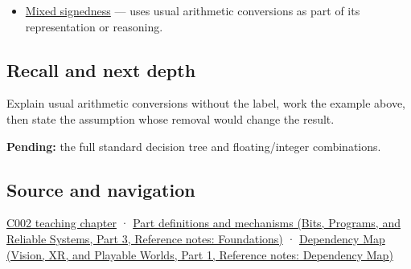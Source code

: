 \hypertarget{appendix-5e2d663adf7f-used-by}{}

\begin{itemize}
\tightlist
\item
  \hyperref[appendix-736a2345de4a]{Mixed signedness} --- uses usual arithmetic conversions as part of its representation or reasoning.
\end{itemize}

\subsection{Recall and next depth}\label{appendix-5e2d663adf7f-recall-and-next-depth}

\hypertarget{appendix-5e2d663adf7f-recall-and-next-depth}{}

Explain usual arithmetic conversions without the label, work the example above, then state the assumption whose removal would change the result.

\textbf{Pending:} the full standard decision tree and floating/integer combinations.

\subsection{Source and navigation}\label{appendix-5e2d663adf7f-source-and-navigation}

\hypertarget{appendix-5e2d663adf7f-source-and-navigation}{}

\hyperref[01-foundations-i-ch001-arithmetic-becomes-a-policy]{C002 teaching chapter} · \href{../01-Bits-Programs-and-Reliable-Systems-P03/main.pdf\#nameddest=appendix-fd090d982a15}{Part definitions and mechanisms (Bits, Programs, and Reliable Systems, Part 3, Reference notes: Foundations)} · \href{../07-Vision-XR-and-Playable-Worlds-P01/main.pdf\#nameddest=appendix-4ad47bdd269a}{Dependency Map (Vision, XR, and Playable Worlds, Part 1, Reference notes: Dependency Map)}
